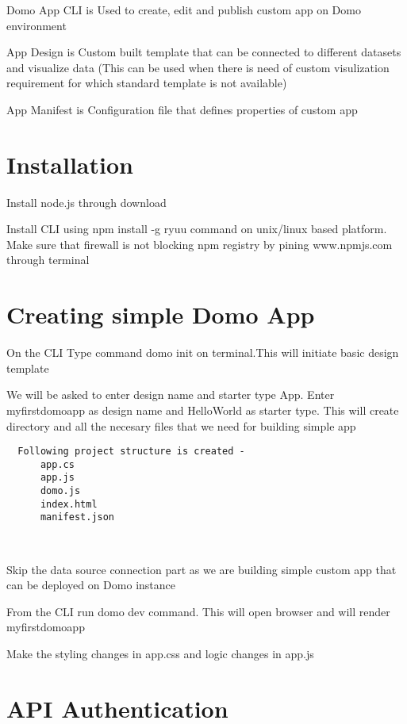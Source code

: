 Domo App CLI is Used to create, edit and publish custom app 
on Domo environment

App Design is Custom built template that can be connected to 
different datasets and visualize data (This can be used when 
there is need of custom visulization requirement for which 
standard template is not available)

App Manifest is Configuration file that defines properties 
of custom app


\section{Installation}

Install node.js through download

Install CLI using npm install -g ryuu command on unix/linux based platform. 
Make sure that firewall is not blocking npm registry by pining 
www.npmjs.com through terminal


\section{Creating simple Domo App}
On the CLI Type command  domo init on terminal.This will initiate basic 
design template

We will be asked to enter design name and starter type App. 
Enter myfirstdomoapp as design name and HelloWorld as starter type. 
This will create directory and all the necesary files that we need for 
building simple app

\begin{verbatim}
  Following project structure is created -
      app.cs
      app.js
      domo.js
      index.html
      manifest.json
\end{verbatim}
~\cite{hid-sp18-523-Dev}

Skip the data source connection part as we are building simple
custom app that can be deployed on Domo instance

From the CLI run domo dev command. This will open browser and will 
render myfirstdomoapp

Make the styling changes in app.css and logic changes in app.js

\section{API Authentication}

